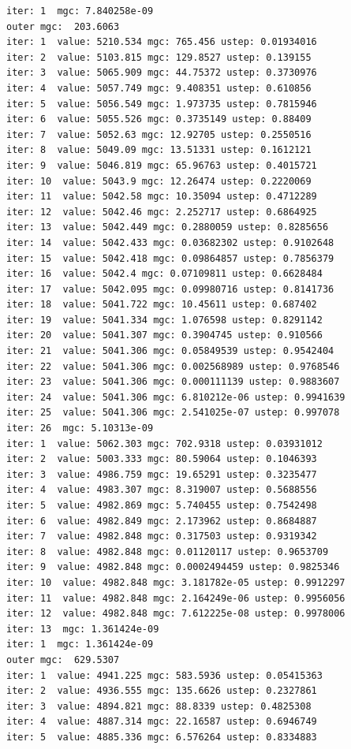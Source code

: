 \documentclass[
  letterpaper,
  DIV=11,
  numbers=noendperiod]{scrartcl}
\begin{document}
\begin{verbatim}
iter: 1  mgc: 7.840258e-09 
outer mgc:  203.6063 
iter: 1  value: 5210.534 mgc: 765.456 ustep: 0.01934016 
iter: 2  value: 5103.815 mgc: 129.8527 ustep: 0.139155 
iter: 3  value: 5065.909 mgc: 44.75372 ustep: 0.3730976 
iter: 4  value: 5057.749 mgc: 9.408351 ustep: 0.610856 
iter: 5  value: 5056.549 mgc: 1.973735 ustep: 0.7815946 
iter: 6  value: 5055.526 mgc: 0.3735149 ustep: 0.88409 
iter: 7  value: 5052.63 mgc: 12.92705 ustep: 0.2550516 
iter: 8  value: 5049.09 mgc: 13.51331 ustep: 0.1612121 
iter: 9  value: 5046.819 mgc: 65.96763 ustep: 0.4015721 
iter: 10  value: 5043.9 mgc: 12.26474 ustep: 0.2220069 
iter: 11  value: 5042.58 mgc: 10.35094 ustep: 0.4712289 
iter: 12  value: 5042.46 mgc: 2.252717 ustep: 0.6864925 
iter: 13  value: 5042.449 mgc: 0.2880059 ustep: 0.8285656 
iter: 14  value: 5042.433 mgc: 0.03682302 ustep: 0.9102648 
iter: 15  value: 5042.418 mgc: 0.09864857 ustep: 0.7856379 
iter: 16  value: 5042.4 mgc: 0.07109811 ustep: 0.6628484 
iter: 17  value: 5042.095 mgc: 0.09980716 ustep: 0.8141736 
iter: 18  value: 5041.722 mgc: 10.45611 ustep: 0.687402 
iter: 19  value: 5041.334 mgc: 1.076598 ustep: 0.8291142 
iter: 20  value: 5041.307 mgc: 0.3904745 ustep: 0.910566 
iter: 21  value: 5041.306 mgc: 0.05849539 ustep: 0.9542404 
iter: 22  value: 5041.306 mgc: 0.002568989 ustep: 0.9768546 
iter: 23  value: 5041.306 mgc: 0.000111139 ustep: 0.9883607 
iter: 24  value: 5041.306 mgc: 6.810212e-06 ustep: 0.9941639 
iter: 25  value: 5041.306 mgc: 2.541025e-07 ustep: 0.997078 
iter: 26  mgc: 5.10313e-09 
iter: 1  value: 5062.303 mgc: 702.9318 ustep: 0.03931012 
iter: 2  value: 5003.333 mgc: 80.59064 ustep: 0.1046393 
iter: 3  value: 4986.759 mgc: 19.65291 ustep: 0.3235477 
iter: 4  value: 4983.307 mgc: 8.319007 ustep: 0.5688556 
iter: 5  value: 4982.869 mgc: 5.740455 ustep: 0.7542498 
iter: 6  value: 4982.849 mgc: 2.173962 ustep: 0.8684887 
iter: 7  value: 4982.848 mgc: 0.317503 ustep: 0.9319342 
iter: 8  value: 4982.848 mgc: 0.01120117 ustep: 0.9653709 
iter: 9  value: 4982.848 mgc: 0.0002494459 ustep: 0.9825346 
iter: 10  value: 4982.848 mgc: 3.181782e-05 ustep: 0.9912297 
iter: 11  value: 4982.848 mgc: 2.164249e-06 ustep: 0.9956056 
iter: 12  value: 4982.848 mgc: 7.612225e-08 ustep: 0.9978006 
iter: 13  mgc: 1.361424e-09 
iter: 1  mgc: 1.361424e-09 
outer mgc:  629.5307 
iter: 1  value: 4941.225 mgc: 583.5936 ustep: 0.05415363 
iter: 2  value: 4936.555 mgc: 135.6626 ustep: 0.2327861 
iter: 3  value: 4894.821 mgc: 88.8339 ustep: 0.4825308 
iter: 4  value: 4887.314 mgc: 22.16587 ustep: 0.6946749 
iter: 5  value: 4885.336 mgc: 6.576264 ustep: 0.8334883 

\end{verbatim}
\end{document}
